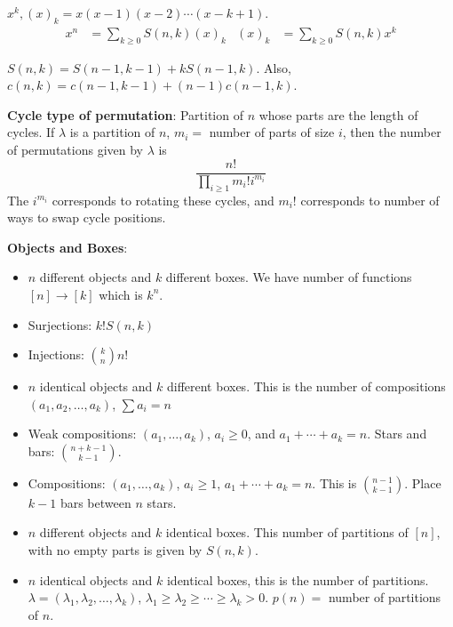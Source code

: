 \documentclass{report}
\begin{document}
$x^{k}, (x)_{k} = x(x - 1)(x - 2) \cdots(x - k + 1)$. 
    \begin{align*}
        x^{n} &= \sum_{k \geq0} S(n, k)(x)_{k} & (x)_{k} &= \sum_{k \geq0} S(n, k)x^{k}   
    \end{align*}

$S(n, k) = S(n - 1, k - 1) + kS(n - 1, k)$. Also, $c(n, k) = c(n - 1, k - 1) + (n - 1)c(n - 1, k)$.

\textbf{Cycle type of permutation}: Partition of $n$ whose parts are the length of cycles. If $\lambda$ is a partition of $n$, $m_{i} = $ number of parts of size $i$, then the number of permutations given by $\lambda$ is 
    \begin{equation*}
        \dfrac{n!}{\prod_{i \geq1} m_{i}!i^{m_{i}}}
    \end{equation*}
The $i^{m_{i}}$ corresponds to rotating these cycles, and $m_{i}!$ corresponds to number of ways to swap cycle positions. 

\textbf{Objects and Boxes}:
    \begin{itemize}
        \item $n$ different objects and $k$ different boxes. We have number of functions $[n] \rightarrow [k]$ which is $k^{n}$. 

        \item Surjections: $k!S(n, k)$

        \item Injections: $\binom{k}{n}n!$

        \item  $n$ identical objects and $k$ different boxes. This is the number of compositions $(a_{1}, a_{2}, \ldots, a_{k})$, $\sum a_{i} = n$

        \item Weak compositions: $(a_{1}, \ldots, a_{k})$, $ a_i\geq0$, and $a_{1} + \cdots + a_{k} = n$. Stars and bars: $\binom{n + k - 1}{k - 1}$. 

        \item Compositions: $(a_{1}, \ldots, a_{k})$, $a_{i} \geq1$, $a_{1} + \cdots + a_{k} = n$. This is $\binom{n - 1}{k - 1}$. Place $k - 1$ bars between $n$ stars. 

        \item $n$ different objects and $k$ identical boxes. This number of partitions of $[n]$, with no empty parts is given by $S(n, k)$. 

        \item $n$ identical objects and $k$ identical boxes, this is the number of partitions. $\lambda = (\lambda_{1}, \lambda_{2}, \ldots, \lambda_{k})$, $\lambda_{1} \geq \lambda_{2} \geq \cdots \geq \lambda_{k} > 0$. $p(n) = $ number of partitions of $n$. 
    \end{itemize}
\end{document}
